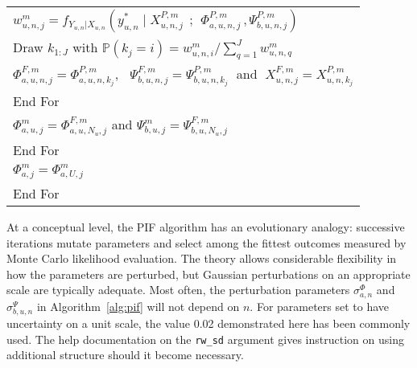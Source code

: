 \documentclass[12pt]{article}\usepackage[]{graphicx}\usepackage[table]{xcolor}
\newcommand\code{\texttt}
\newcommand\np{j}
\newcommand\unit{u} %
\newcommand\Unit{U} %
\renewcommand\time{n}
\newcommand\Shared{\Phi}
\newcommand\Specific{\Psi}
\newcommand\nshared{a}
\newcommand\nspecific{b}
\newcommand\mystretch{\rule[-2mm]{0mm}{5mm} }
\newcommand\myBigStretch{\rule[-3mm]{0mm}{5mm} }
\newcommand\asp{\hspace{6mm}}
\newcommand\giventh{{\,;\,}}
\newcommand\prob{\mathbb{P}}
\begin{document}
\begin{algorithm}[t!]
\begin{tabular}{l}
\asp \asp \asp $w_{\unit,n,j}^m = f_{Y_{\unit,n}|X_{\unit,n}}
    \left(y^*_{\unit,n} \; \big| \; X_{\unit,n,j}^{P,m} \; \giventh \;
       \Shared^{P,m}_{\nshared,\unit,\time,j} \, ,
       \Specific^{P,m}_{\nspecific,\unit,\time,j}
    \right)$  \myBigStretch\\
\asp \asp \asp Draw $k_{1:J}$ with $\prob(k_j=i)=  w_{\unit,n,i}^m\Big/\sum_{q=1}^J w_{\unit,n,q}^m$ \myBigStretch \\
\asp \asp \asp $\Shared^{F,m}_{\nshared,\unit,\time,\np}=\Shared^{P,m}_{\nshared,\unit,\time,k_{\np}}$,  $\;\; \Specific^{F,m}_{\nspecific,\unit,\time,\np}=\Specific^{P,m}_{\nspecific,\unit,\time,k_{\np}} \;$
and $\; X^{F,m}_{\unit,n,j}=X^{P,m}_{\unit,n,k_j}$   \mystretch\\
\asp \asp End For \\ %
\asp \asp  $\Shared^{m}_{\nshared,\unit,\np}=\Shared^{F,m}_{\nshared,\unit,N_{\unit},\np}$ and
           $\Specific^{m}_{\nspecific,\unit,\np}=\Specific^{F,m}_{\nspecific,\unit,N_{\unit},\np}$
 \\
\asp End For \\ %
\asp $\Shared^{m}_{\nshared,\np}=\Shared^m_{\nshared,\Unit,\np}$
\\
End For \\ %
\end{tabular}
\end{algorithm}

At a conceptual level, the PIF algorithm has an evolutionary analogy: successive iterations mutate parameters and select among the fittest outcomes measured by Monte Carlo likelihood evaluation.
The theory allows considerable flexibility in how the parameters are perturbed, but Gaussian perturbations on an appropriate scale are typically adequate.
Most often, the perturbation parameters
$\sigma^\Shared_{\nshared,\time}$ and $\sigma^\Specific_{\nspecific,\unit,\time}$ in Algorithm~\ref{alg:pif} will not depend on $\time$.
For parameters set to have uncertainty on a unit scale, the value 0.02 demonstrated here has been commonly used.
The help documentation on the \code{rw\_sd} argument gives instruction on using additional structure should it become necessary.
\end{document}
